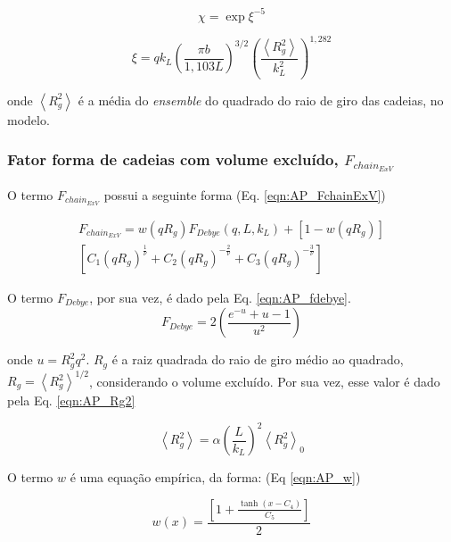 \begin{apendicesenv}
\begin{equation}
\chi = \exp{\xi^{-5}}
\label{eqn:AP_chi}
\end{equation}

\begin{equation}
\xi = q k_L\left(\frac{\pi b}{1,103L}\right)^{3/2}\left(\frac{\left<R_g^2\right>}{k_L^2}\right)^{1,282}
\label{eqn:AP_xi}
\end{equation}

\noindent onde \(\left<R_g^2\right>\) é a média do \emph{ensemble} do quadrado do raio de giro das cadeias, no modelo.

\subsubsection{Fator forma de cadeias com volume excluído, \(F_{chain_{ExV}}\)}
\label{sec:F_chain_ExV_equacoes}
O termo \(F_{chain_{ExV}}\) possui a seguinte forma (Eq. \ref{eqn:AP_FchainExV})

\begin{multline}
F_{chain_{ExV}} = w(qR_g)F_{Debye}(q,L,k_L) + \left[1 - w(q R_g)\right] \\ \left[C_1(q R_g)^{\frac{1}{\nu}} + C_2(q R_g)^{-\frac{2}{\nu}} + 
C_3(q R_g)^{-\frac{3}{\nu}}\right]
\label{eqn:AP_FchainExV}
\end{multline}

O termo \(F_{Debye}\), por sua vez, é dado pela Eq. \ref{eqn:AP_fdebye}.
\begin{equation}
F_{Debye} = 2 \left(\frac{e^{-u} + u - 1}{u^2}\right)
\label{eqn:AP_fdebye}
\end{equation}

\noindent onde \(u = R_g^2q^2\). \(R_g\) é a raiz quadrada do raio de giro médio ao quadrado, \(R_g = \left<R_g^2\right>^{1/2}\), considerando o volume excluído. Por sua vez, esse valor é dado pela Eq. \ref{eqn:AP_Rg2}

\begin{equation}
\left<R_g^2\right> = \alpha \left(\frac{L}{k_L}\right)^2\left<R_g^2\right>_0
\label{eqn:AP_Rg2}
\end{equation}

O termo \(w\) é uma equação empírica, da forma: (Eq \ref{eqn:AP_w})

\begin{equation}
w(x) = \frac{\left[1 + \frac{\tanh(x-C_4)}{C_5}\right]}{2}
\label{eqn:AP_w}
\end{equation}


\end{apendicesenv}
